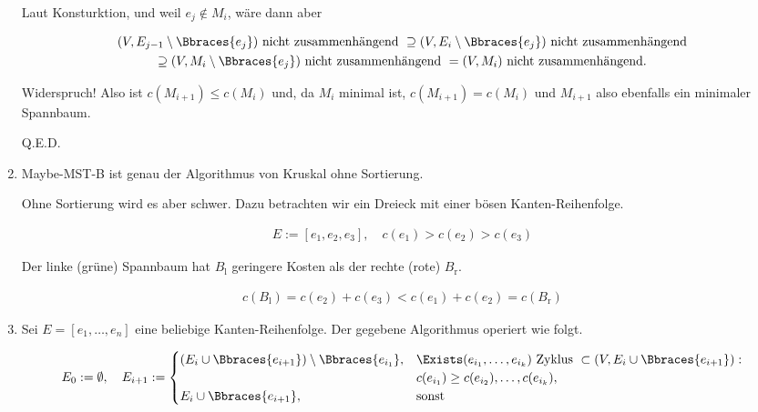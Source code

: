 \begin{solution}
\begin{enumerate}[label = (\Alph*)]
    Laut Konsturktion, und weil $e_j \not \in M_i$, wäre dann aber

    \begin{multline*}
        (V, E_{j-1} \setminus \Bbraces{e_j}) ~\text{nicht zusammenhängend}~
        \supseteq
        (V, E_i     \setminus \Bbraces{e_j}) ~\text{nicht zusammenhängend} \\
        \supseteq
        (V, M_i     \setminus \Bbraces{e_j}) ~\text{nicht zusammenhängend}~
        =
        (V, M_i)                             ~\text{nicht zusammenhängend.}
    \end{multline*}

    Widerspruch!
    Also ist $c(M_{i+1}) \leq c(M_i)$ und, da $M_i$ minimal ist, $c(M_{i+1}) = c(M_i)$ und $M_{i+1}$ also ebenfalls ein minimaler Spannbaum.

    Q.E.D.

    \item Maybe-MST-B ist genau der Algorithmus von Kruskal ohne Sortierung.


    Ohne Sortierung wird es aber schwer.
    Dazu betrachten wir ein Dreieck mit einer bösen Kanten-Reihenfolge.

    \begin{align*}
        E := [e_1, e_2, e_3],
        \quad
        c(e_1) > c(e_2) > c(e_3)
    \end{align*}

    \begin{center}
        
    \end{center}

    Der linke (grüne) Spannbaum hat $B_\mathrm{l}$ geringere Kosten als der rechte (rote) $B_\mathrm{r}$.

    \begin{align*}
        c(B_\mathrm{l})
        =
        c(e_2) + c(e_3)
        <
        c(e_1) + c(e_2)
        =
        c(B_\mathrm{r})
    \end{align*}

    \item Sei $E = [e_1, \dots, e_n]$ eine beliebige Kanten-Reihenfolge.
    Der gegebene Algorithmus operiert wie folgt.

    \begin{align*}
        E_0 := \emptyset,
        \quad
        E_{i+1}
        :=
        \begin{cases}
            (E_i \cup \Bbraces{e_{i+1}}) \setminus \Bbraces{e_{i_1}},
            &
            \Exists (e_{i_1}, \dots, e_{i_k}) ~\text{Zyklus}~ \subset (V, E_i \cup \Bbraces{e_{i+1}}): \\
            &
            c(e_{i_1}) \geq c(e_{i_2}), \dots, c(e_{i_k}), \\
            E_i \cup \Bbraces{e_{i+1}}, & \text{sonst}
        \end{cases}
    \end{align*}


\end{enumerate}
\end{solution}
